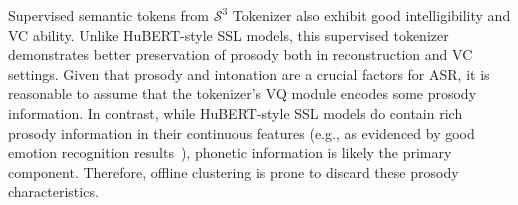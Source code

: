 Supervised semantic tokens from $\mathcal S^3$ Tokenizer also exhibit good intelligibility and VC ability.
Unlike HuBERT-style SSL models, this supervised tokenizer demonstrates better preservation of prosody both in reconstruction and VC settings.
Given that prosody and intonation are a crucial factors for ASR, it is reasonable to assume that the tokenizer's VQ module encodes some prosody information.
In contrast, while HuBERT-style SSL models do contain rich prosody information in their continuous features (e.g., as evidenced by good emotion recognition results~\cite{superb}), phonetic information is likely the primary component.
Therefore, offline clustering is prone to discard these prosody characteristics.

